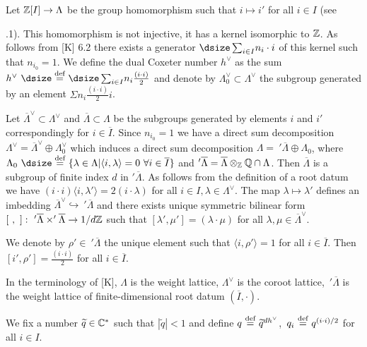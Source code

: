 Let  ${\Bbb Z}[I] \to \Lambda$  be the group
homomorphism such that  $i \longmapsto i'$  for all  $i \in I$  (see

.1).  This homomorphism is not injective, it has a kernel
isomorphic to ${\Bbb Z}$.  As follows from [K] 6.2 there exists a generator
${\dsize\sum_{i\in I}} n_i\cdot i$ of this kernel such that  $n_{i_0} = 1$.  We
define the dual Coxeter
number $h^\vee$ as the sum\ $h^\vee\ {\dsize\buildrel{\text{def}}\over =}\
{\dsize\sum_{i\in I}} n_i {\frac{(i\cdot i)}{2}}$ and denote by
$\Lambda^\vee_0 \subset \Lambda^\vee$  the subgroup generated by an element
$\Sigma n_i {\frac{(i\cdot i)}{2}} i$.

Let  $\overline{\Lambda}^\vee \subset \Lambda^\vee$  and $\overline{\Lambda}
\subset \Lambda$ be the subgroups generated by elements  $i$ and  $i'$
correspondingly for  $i \in \overline{I}$.  Since $n_{i_0} = 1$  we have a
direct sum
decomposition  $\Lambda^\vee = \overline{\Lambda}^\vee \oplus \Lambda^\vee_0$
which induces a direct sum decomposition $\Lambda =\ {}'\overline{\Lambda}
\oplus
\Lambda_0$, where  $\Lambda_0\ {\dsize\buildrel{\text{def}}\over =}\
\{ \lambda \in \Lambda| \langle i,\lambda\rangle = 0\ \forall i \in
\overline{I}\}$  and $'\overline{\Lambda} = \overline{\Lambda} \otimes_{\Bbb Z}
{\Bbb Q} \cap \Lambda$.  Then $\overline{\Lambda}$  is a subgroup of finite
index $d$ in $'\overline{\Lambda}$.  As follows from the definition of a root
datum we have  $(i \cdot i) \langle i,\lambda'\rangle = 2(i \cdot \lambda)$
for
all $i \in I, \lambda \in \Lambda^\vee$.  The map  $\lambda \longmapsto
\lambda'$
defines an imbedding  $\overline{\Lambda}^\vee \hookrightarrow\
{}'\overline{\Lambda}$  and there exists unique symmetric bilinear form
$[\ ,\ ]:\  {}'\overline{\Lambda} \times '\overline{\Lambda} \to 1/d {\Bbb Z}$
such that  $[\lambda',\mu'] = (\lambda \cdot \mu)$  for all
$\lambda, \mu \in \overline{\Lambda}^\vee$.

We denote by  $\rho' \in\ {}'\overline{\Lambda}$  the unique element such that
$\langle i,\rho'\rangle = 1$  for all $i \in \overline{I}$.  Then
$[i',\rho'] = {\frac{(i\cdot i)}{2}}$ for all $i \in \overline{I}$.

\demo{Remark}  In the terminology of [K], $\Lambda$ is the weight lattice,
$\Lambda^\vee$  is the coroot lattice,\ ${}'\overline{\Lambda}$  is the weight
lattice of finite-dimensional root datum  $(\overline{I}, \cdot)$.
\enddemo

\subheading{2.1.2}  We fix a number $\widetilde{q} \in {\Bbb C}^*$  such that
$|\widetilde{q}| < 1$  and define  $q\ {\buildrel{\text{def}}\over =}\
\widetilde{q}^{dh^\vee}$,\  $q_i\ {\buildrel{\text{def}}\over =}\ q^{(i\cdot
i)/2}$
for all $i \in I$.

